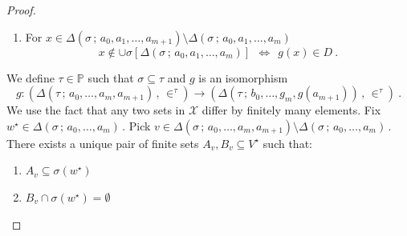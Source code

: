 \documentclass[10pt,a4paper, openany,  oldfontcommands]{memoir}
\newtheorem{open problem} [theorem] {Open Problem}
\begin{document}
\begin{proof}
\begin{enumerate}
\item For  $  x  \in   \Delta  \left(  \sigma  \,  ;  \,     a_0, a_1,  \ldots , a_{ m+1}   \right)    \setminus  
 \Delta  \left(  \sigma  \,  ;  \,     a_0, a_1,  \ldots , a_{ m}   \right)   $
\[
x    \not\in  \cup   \sigma  \left[   \Delta  \left(  \sigma  \,  ;  \,     a_0, a_1,  \ldots , a_{ m}   \right)    \right]  
\     \       \Leftrightarrow        \         \   
g(x)    \in   D
\        .
\]
\end{enumerate}



We define  $  \tau  \in  \mathbb{P} $  such that  
$  \sigma   \subseteq   \tau  $  and  $g$ is an isomorphism 
    \[
g :       \left(  \Delta  \left(  \tau  \,  ;  \,     a_0,  \ldots , a_m , a_{ m+1}  \right)    \,  ,   \,  \in^{   \tau   }    \right)     
  \to   
      \left(   \Delta      \left(   \tau     \,  ;  \,      b_0,  \ldots , g_m ,   g  \left( a_{ m+1}  \right)    \right)   \,  ,   \,  \in^{   \tau   }    \right) 
  \       .     
      \]
We use the fact that any two sets in  $  \mathcal{X} $  differ by finitely  many elements.    
Fix  $  w^{  \star }   \in       \Delta  \left(  \sigma  \,  ;  \,     a_0,  \ldots , a_m   \right)       \,   $. 
Pick  $   v  \in  \Delta  \left(  \sigma  \,  ;  \,     a_0,  \ldots , a_m , a_{ m+1}  \right)     \setminus  
\Delta  \left(  \sigma  \,  ;  \,     a_0,  \ldots , a_m  \right)        \,     $. 
There exists a unique pair of finite sets  $  A_v ,  B_v  \subseteq  V^{  \star }     $   such that: 
\begin{enumerate}
\item   $  A_v  \subseteq    \sigma  \left(   w^{  \star }  \right)  $  

\item   $  B_v  \cap    \sigma  \left(   w^{  \star }  \right)   =   \emptyset  $




\end{enumerate}
\end{proof}
\end{document}
